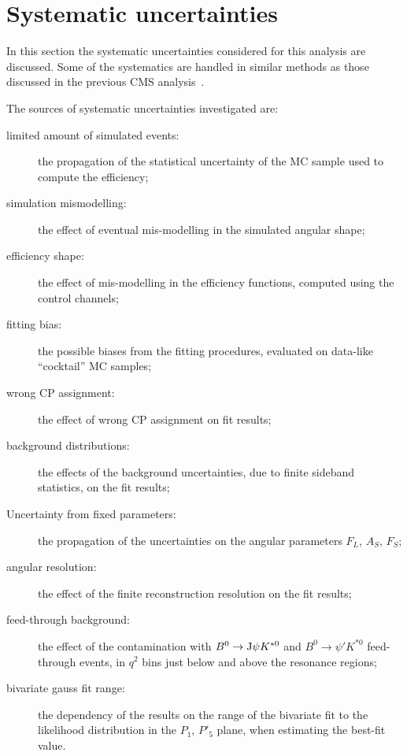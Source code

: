 \section{Systematic uncertainties}\label{sec:syst}

In this section the systematic uncertainties considered for this analysis are discussed.
Some of the systematics are handled in similar methods as those discussed in the previous CMS analysis~\cite{Khachatryan:2015isa,AN-14-129}.

The sources of systematic uncertainties investigated are:
\begin{description}
\item[limited amount of simulated events:] the propagation of the statistical uncertainty of the MC sample used to compute the efficiency;

\item[simulation mismodelling:] the effect of eventual mis-modelling in the simulated angular shape;

\item[efficiency shape:] the effect of mis-modelling in the efficiency functions, computed using the control channels;

\item[fitting bias:] the possible biases from the fitting procedures, evaluated on data-like ``cocktail'' MC samples;

\item[wrong CP assignment:] the effect of wrong CP assignment on fit results;

\item[background distributions:] the effects of the background \pdf uncertainties, due to finite sideband statistics, on the fit results;

\item[Uncertainty from fixed \pdf parameters:] the propagation of the uncertainties on the angular parameters $F_L$, $A_S$, $F_S$;

\item[angular resolution:] the effect of the finite reconstruction resolution on the fit results;
  
\item[feed-through background:] the effect of the contamination with $B^0 \to {\rm J}\psi K^{*0}$ and $B^0 \to \psi' K^{*0}$ feed-through events, in $q^2$ bins just below and above the resonance regions;

\item[bivariate gauss fit range:] the dependency of the results on the range of the bivariate fit to the likelihood distribution in the $P_1$, $P'_5$ plane, when estimating the best-fit value.

\end{description}


